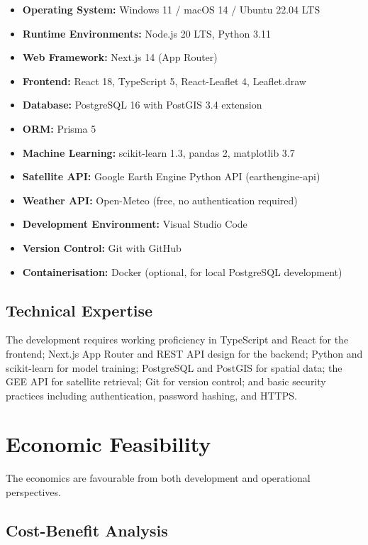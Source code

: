 \documentclass[12pt,a4paper]{report}
\begin{document}
\begin{itemize}
  \item \textbf{Operating System:} Windows 11 / macOS 14 / Ubuntu 22.04 LTS
  \item \textbf{Runtime Environments:} Node.js 20 LTS, Python 3.11
  \item \textbf{Web Framework:} Next.js 14 (App Router)
  \item \textbf{Frontend:} React 18, TypeScript 5, React-Leaflet 4, Leaflet.draw
  \item \textbf{Database:} PostgreSQL 16 with PostGIS 3.4 extension
  \item \textbf{ORM:} Prisma 5
  \item \textbf{Machine Learning:} scikit-learn 1.3, pandas 2, matplotlib 3.7
  \item \textbf{Satellite API:} Google Earth Engine Python API (earthengine-api)
  \item \textbf{Weather API:} Open-Meteo (free, no authentication required)
  \item \textbf{Development Environment:} Visual Studio Code
  \item \textbf{Version Control:} Git with GitHub
  \item \textbf{Containerisation:} Docker (optional, for local PostgreSQL development)
\end{itemize}

\subsection{Technical Expertise}

The development requires working proficiency in TypeScript and React for the frontend; Next.js App Router and REST API design for the backend; Python and scikit-learn for model training; PostgreSQL and PostGIS for spatial data; the GEE API for satellite retrieval; Git for version control; and basic security practices including authentication, password hashing, and HTTPS.

\section{Economic Feasibility}

The economics are favourable from both development and operational perspectives.

\subsection{Cost-Benefit Analysis}
\end{document}
